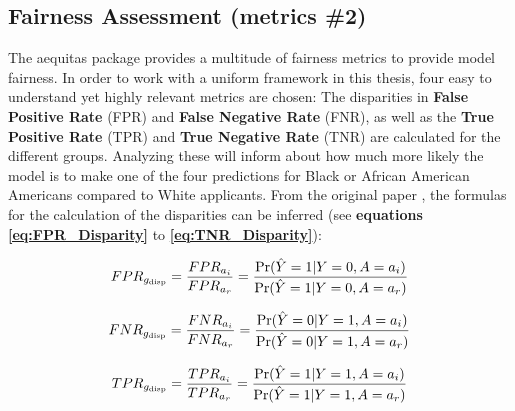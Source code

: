 \subsection{Fairness Assessment (metrics \#2)}\label{subsec:Fairness_Assessment}


The aequitas package provides a multitude of fairness metrics to provide model fairness. In order to work with a uniform framework in this thesis, four easy to understand yet highly relevant metrics are chosen: 
The disparities in \textbf{False Positive Rate} (FPR) and \textbf{False Negative Rate} (FNR), as well as the \textbf{True Positive Rate} (TPR) and \textbf{True Negative Rate} (TNR) are calculated for the different groups.
Analyzing these will inform about how much more likely the model is to make one of the four predictions for Black or African American Americans compared to White applicants.
From the original paper \parencite{2018aequitas}, the formulas for the calculation of the disparities can be inferred (see \textbf{equations \ref{eq:FPR_Disparity}} to \textbf{\ref{eq:TNR_Disparity}}):

\begin{equation}
    FPR_{g_{\text{disp}}} = \frac{FPR_{a_i}}{FPR_{a_r}} = \frac{\Pr(\hat{Y}=1 | Y=0, A=a_i)}{\Pr(\hat{Y}=1 | Y=0, A=a_r)}
    \label{eq:FPR_Disparity}
    \addcontentsline{frm}{formulas}{\protect\numberline{\theequation}\hspace{1em}FPR Disparity}
\end{equation}

\begin{equation}
    FNR_{g_{\text{disp}}} = \frac{FNR_{a_i}}{FNR_{a_r}} = \frac{\Pr(\hat{Y}=0 | Y=1, A=a_i)}{\Pr(\hat{Y}=0 | Y=1, A=a_r)}
    \label{eq:FNR_Disparity}
    \addcontentsline{frm}{formulas}{\protect\numberline{\theequation}\hspace{1em}FNR Disparity}
\end{equation}

\begin{equation}
    TPR_{g_{\text{disp}}} = \frac{TPR_{a_i}}{TPR_{a_r}} = \frac{\Pr(\hat{Y}=1 | Y=1, A=a_i)}{\Pr(\hat{Y}=1 | Y=1, A=a_r)}
    \label{eq:TPR_Disparity}
    \addcontentsline{frm}{formulas}{\protect\numberline{\theequation}\hspace{1em}TPR Disparity}
\end{equation}

